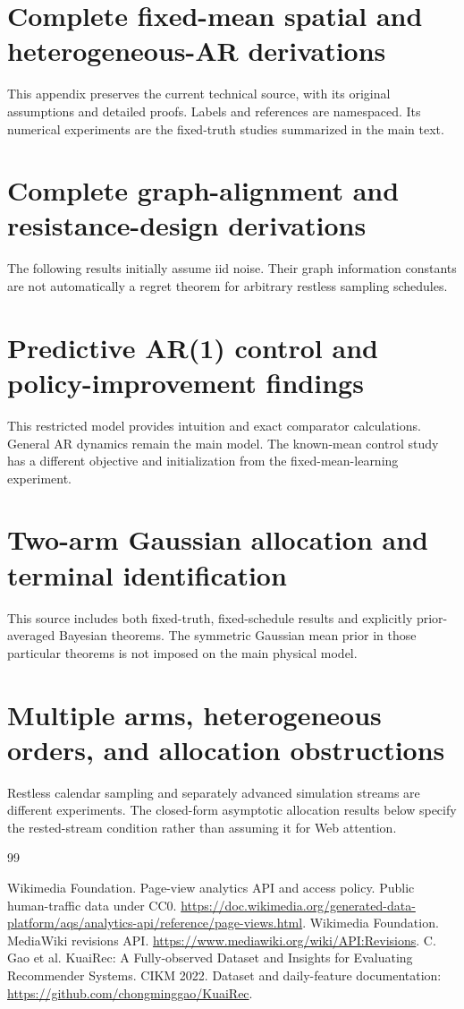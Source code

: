 \documentclass[11pt]{article}
\begin{document}
\section{Complete fixed-mean spatial and heterogeneous-AR derivations}
\label{app:st}
This appendix preserves the current technical source, with its original assumptions and detailed proofs. Labels and references are namespaced. Its numerical experiments are the fixed-truth studies summarized in the main text.

\clearpage
\section{Complete graph-alignment and resistance-design derivations}
\label{app:alignment}
The following results initially assume iid noise. Their graph information constants are not automatically a regret theorem for arbitrary restless sampling schedules.

\clearpage
\section{Predictive AR(1) control and policy-improvement findings}
\label{app:predictive}
This restricted model provides intuition and exact comparator calculations. General AR dynamics remain the main model. The known-mean control study has a different objective and initialization from the fixed-mean-learning experiment.

\clearpage
\section{Two-arm Gaussian allocation and terminal identification}
\label{app:two}
This source includes both fixed-truth, fixed-schedule results and explicitly prior-averaged Bayesian theorems. The symmetric Gaussian mean prior in those particular theorems is not imposed on the main physical model.

\clearpage
\section{Multiple arms, heterogeneous orders, and allocation obstructions}
\label{app:arp}
Restless calendar sampling and separately advanced simulation streams are different experiments. The closed-form asymptotic allocation results below specify the rested-stream condition rather than assuming it for Web attention.

\clearpage
\begin{thebibliography}{99}

 Wikimedia Foundation. Page-view analytics API and access policy. Public human-traffic data under CC0. \url{https://doc.wikimedia.org/generated-data-platform/aqs/analytics-api/reference/page-views.html}.
 Wikimedia Foundation. MediaWiki revisions API. \url{https://www.mediawiki.org/wiki/API:Revisions}.
 C. Gao et al. KuaiRec: A Fully-observed Dataset and Insights for Evaluating Recommender Systems. CIKM 2022. Dataset and daily-feature documentation: \url{https://github.com/chongminggao/KuaiRec}.
\end{thebibliography}
\end{document}
